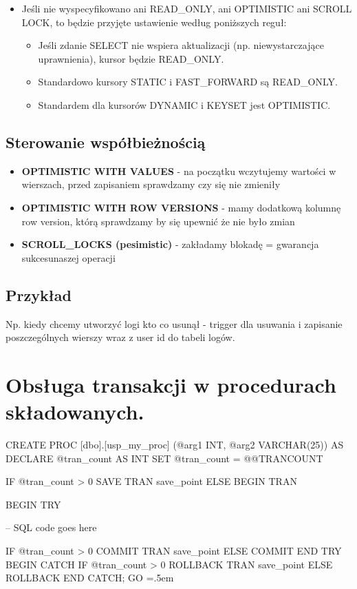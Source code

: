 \documentclass[a4paper]{article}
\newenvironment{lcverbatim}
{\SaveVerbatim{cverb}}
{\endSaveVerbatim
\flushleft\fboxrule=0pt\fboxsep=.5em
\colorbox{cverbbg}{%
\makebox[\dimexpr\linewidth-2\fboxsep][l]{\BUseVerbatim{cverb}}%
}
\endflushleft
}
\begin{document}
\begin{itemize}
        \begin{itemize}
            \item Jeśli nie wyspecyfikowano ani READ\_ONLY, ani OPTIMISTIC ani SCROLL LOCK, to będzie przyjęte ustawienie według poniższych reguł:
            \begin{itemize}
                \item Jeśli zdanie SELECT nie wspiera aktualizacji (np. niewystarczające uprawnienia), kursor
                będzie READ\_ONLY.
                \item Standardowo kursory STATIC i FAST\_FORWARD są READ\_ONLY.
                \item Standardem dla kursorów DYNAMIC i KEYSET jest OPTIMISTIC.
            \end{itemize}
        \end{itemize}
    \end{itemize}

    \subsection{Sterowanie współbieżnością}
    \begin{itemize}
        \item \textbf{OPTIMISTIC WITH VALUES} - na początku wczytujemy wartości w wierszach, przed zapisaniem sprawdzamy
        czy się nie zmieniły
        \item \textbf{OPTIMISTIC WITH ROW VERSIONS} - mamy dodatkową kolumnę row version, którą sprawdzamy by się upewnić
        że nie było zmian
        \item \textbf{SCROLL\_LOCKS (pesimistic)} - zakładamy blokadę = gwarancja sukcesunaszej operacji
    \end{itemize}

    \subsection{Przykład}
    Np. kiedy chcemy utworzyć logi kto co usunął - trigger dla usuwania i zapisanie poszczególnych wierszy wraz z user id
    do tabeli logów.

    \section{Obsługa transakcji w procedurach składowanych.}
    \begin{lcverbatim}
        CREATE PROC [dbo].[usp_my_proc] (@arg1 INT, @arg2 VARCHAR(25))
        AS
        DECLARE @tran_count AS INT
        SET @tran_count = @@TRANCOUNT

        IF @tran_count > 0
        SAVE TRAN save_point
        ELSE
        BEGIN TRAN

        BEGIN TRY

        -- SQL code goes here

        IF @tran_count > 0
        COMMIT TRAN save_point
        ELSE
        COMMIT
        END TRY
        BEGIN CATCH
        IF @tran_count > 0
        ROLLBACK TRAN save_point
        ELSE
        ROLLBACK
        END CATCH;
        GO
    \end{lcverbatim}
\end{document}
